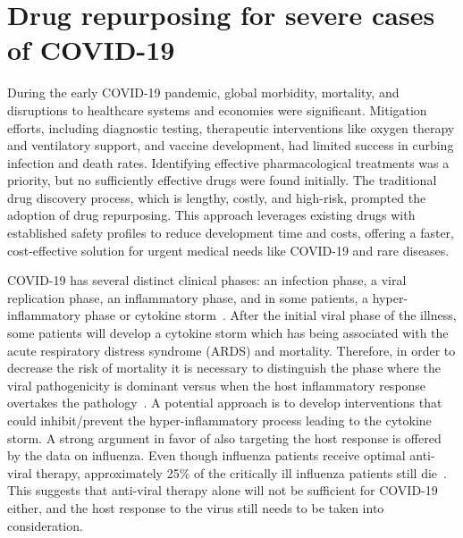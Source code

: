 \documentclass[Minh_PhD_thesis.tex]{subfiles}
\begin{document}
\section{Drug repurposing for severe cases of COVID-19}
\label{chap:COVID_Study}

During the early COVID-19 pandemic, global morbidity, mortality, and disruptions to healthcare systems and economies were significant. Mitigation efforts, including diagnostic testing, therapeutic interventions like oxygen therapy and ventilatory support, and vaccine development, had limited success in curbing infection and death rates. Identifying effective pharmacological treatments was a priority, but no sufficiently effective drugs were found initially. The traditional drug discovery process, which is lengthy, costly, and high-risk, prompted the adoption of drug repurposing. This approach leverages existing drugs with established safety profiles to reduce development time and costs, offering a faster, cost-effective solution for urgent medical needs like COVID-19 and rare diseases.


COVID-19 has several distinct clinical phases:  an infection phase, a viral replication phase, an inflammatory phase, and in some patients, a hyper-inflammatory phase or cytokine storm~\cite{siddiqi2020covid,Ayres2020:survivingCOVID19}. After the initial viral phase of the illness, some patients will develop a cytokine storm which has being associated with the acute respiratory distress syndrome (ARDS) and mortality.  Therefore, in order to decrease the risk of mortality it is necessary to distinguish the phase where the viral pathogenicity is dominant versus when the host inflammatory response overtakes the pathology~\cite{siddiqi2020covid,Ayres2020:survivingCOVID19}. A potential approach is to develop interventions that could inhibit/prevent the hyper-inflammatory process leading to the cytokine storm.
A strong argument in favor of also targeting the host response is offered by the data on influenza. Even though influenza patients receive optimal anti-viral therapy, approximately 25\% of the critically ill influenza patients still die~\cite{Ayres2020:survivingCOVID19,louie2012treatment}. This suggests that anti-viral therapy alone will not be sufficient for COVID-19 either, and the host response to the virus still needs to be taken into consideration.
\end{document}
